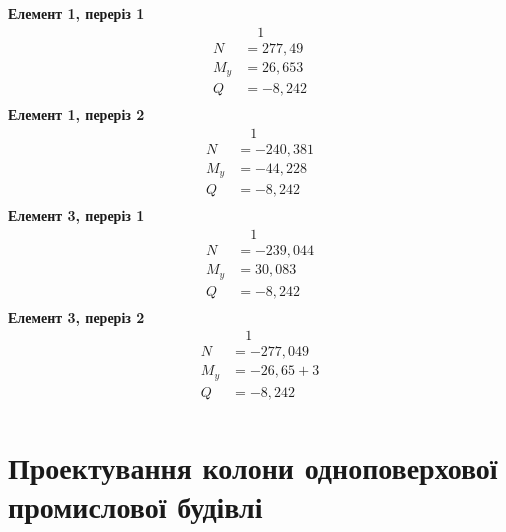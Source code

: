 \documentclass[a4paper,14pt]{article}
\begin{document}
\begin{enumerate}
        \textbf{Елемент 1, переріз 1}
        \begin{equation*}
            \begin{aligned}
            &\quad1  \\
            N &= 277,49 \\
            M_y &= 26,653  \\
            Q &= -8,242 \\
            \end{aligned}
            \end{equation*}
        \textbf{Елемент 1, переріз 2}
        \begin{equation*}
            \begin{aligned}
            &\quad1  \\
            N &= -240,381 \\
            M_y &= -44,228  \\
            Q &= -8,242 \\
            \end{aligned}
            \end{equation*}
        \textbf{Елемент 3, переріз 1}
        \begin{equation*}
            \begin{aligned}
            &\quad1  \\
            N &= -239,044 \\
            M_y &= 30,083  \\
            Q &= -8,242 \\
            \end{aligned}
            \end{equation*}
            \textbf{Елемент 3, переріз 2}
        \begin{equation*}
            \begin{aligned}
            &\quad1  \\
            N &= -277,049 \\
            M_y &= -26,65+3  \\
            Q &= -8,242 \\
            \end{aligned}
            \end{equation*}
\end{enumerate}



\newpage
\section{Проектування колони одноповерхової промислової будівлі}
\end{document}
